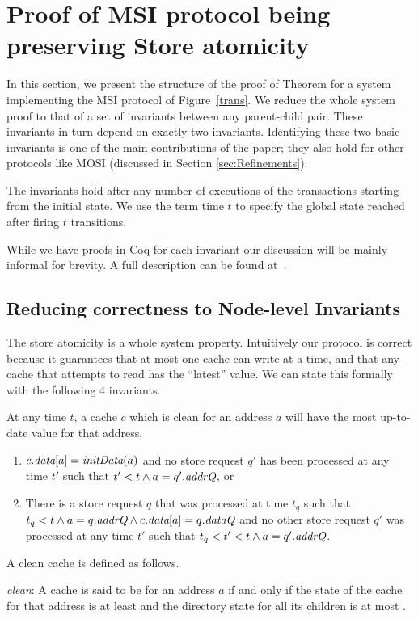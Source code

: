 \section{Proof of MSI protocol being preserving Store atomicity}
\label{safety}

In this section, we present the structure of the proof of Theorem
 for a system implementing the MSI protocol of
Figure~\ref{trans}. We reduce the whole system proof to that of a set of
invariants between any parent-child pair. These invariants in turn depend on
exactly two invariants. Identifying these two basic invariants is one of the
main contributions of the paper; they also hold for other protocols like MOSI
(discussed in Section \ref{sec:Refinements}).

The invariants hold after any number of executions of the transactions starting
from the initial state. We use the term time $t$ to specify the global state
reached after firing $t$ transitions.

While we have proofs in Coq for each invariant our discussion will be mainly
informal for brevity. A full description can be found at~.

\subsection{Reducing correctness to Node-level Invariants}

The store atomicity is a whole system property. Intuitively our
protocol is correct because it guarantees that at most one cache can
write at a time, and that any cache that attempts to read has
the ``latest'' value. We can state this formally with the following 4
invariants.

\begin{inv}
At any time $t$, a cache $c$ which is clean for an address $a$ will have the most
up-to-date value for that address, \ie{}
\begin{enumerate}
\item $c.\textit{data}[a] = \textit{initData}(a)$ and no store request $q'$ has been processed at
any time $t'$ such that $t' < t \wedge a = q'.\textit{addrQ}$, or
\item There is a store request $q$ that was processed at time $t_q$ such that
$t_q < t \wedge a = q.\textit{addrQ} \wedge c.\textit{data}[a] = q.\textit{dataQ}$ and no other store
request $q'$ was processed at any time $t'$ such that $t_q < t' < t \wedge a =
q'.\textit{addrQ}$.
\end{enumerate}
\label{latestValue}
\end{inv}
A clean cache is defined as follows.
\begin{defn}
\textit{clean}: A cache is said to be \clean{} for an address $a$ if and only if
the state of the cache for that address is at least \Sh{} and the directory 
state for all its children is at most \Sh.
\end{defn}

